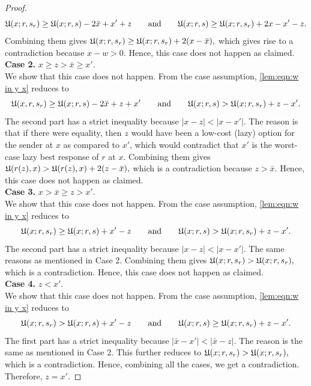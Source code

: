 \begin{proof}
        \begin{equation}
            \mathfrak{U}(x;r,s_r) \geq \mathfrak{U}(x;r,s) - 2\bar{x} + x' + z \quad \hbox{\quad and\quad} \quad \mathfrak{U}(x;r,s) \geq \mathfrak{U}(x;r,s_r) + 2x - x' - z.
        \end{equation}
        Combining them gives
        $
        \mathfrak{U}(x;r,s_r) \geq \mathfrak{U}(x;r,s_r) + 2(x-\bar{x}),
        $
        which gives rise to a contradiction because $x - w > 0$. Hence, this case does not happen as claimed.\\
\textbf{Case 2. }{$x \geq z > \bar{x} \geq x'$.} \\
        We show that this case does not happen. From the case assumption, \eqref{lem:eqn:w in y x} reduces to
        \begin{equation}
            \mathfrak{U}(x,r,s_r) \geq \mathfrak{U}(x;r,s) - 2\bar{x} + z + x' \quad \hbox{\quad and\quad} \quad \mathfrak{U}(x;r,s) > \mathfrak{U}(x;r,s_r) + z - x'.
        \end{equation}
        The second part has a strict inequality because $|x-z| < |x-x'|$. The reason is that if there were equality, then $z$ would have been a low-cost (lazy) option for the sender at $x$ as compared to $x'$, which would contradict that $x'$ is the worst-case lazy best response of $r$ at $x$.
        Combining them gives
        $
        \mathfrak{U}(r(z),x) > \mathfrak{U}(r(z),x) + 2(z-\bar{x}),
        $
        which is a contradiction because $z > \bar{x}$. Hence, this case does not happen as claimed.\\
\textbf{Case 3. }{$x > \bar{x} \geq z > x'$.} \\
        We show that this case does not happen. From the case assumption, \eqref{lem:eqn:w in y x} reduces to
        \begin{equation}
            \mathfrak{U}(x;r,s_r) \geq \mathfrak{U}(x;r,s) + x' - z \quad \hbox{\quad and\quad} \quad \mathfrak{U}(x;r,s) > \mathfrak{U}(x;r,s_r) + z - x'.
        \end{equation}
        The second part has a strict inequality because $|x-z| < |x-x'|$. The same reasons as mentioned in Case 2. Combining them gives
        $
        \mathfrak{U}(x;r,s_r) > \mathfrak{U}(x;r,s_r),
        $
        which is a contradiction. Hence, this case does not happen as claimed.\\
\textbf{Case 4. }{$z < x'$.} \\
        We show that this case does not happen. From the case assumption, \eqref{lem:eqn:w in y x} reduces to
        \begin{equation}
            \mathfrak{U}(x;r,s_r) > \mathfrak{U}(x;r,s) + x' - z \quad \hbox{\quad and\quad} \quad \mathfrak{U}(x;r,s) \geq \mathfrak{U}(x;r,s_r) + z - x'.
        \end{equation}
        The first part has a strict inequality because $|\bar{x}-x'| < |\bar{x}-z|$. The reason is the same as mentioned in Case 2. This further reduces to
        $
        \mathfrak{U}(x;r,s_r) > \mathfrak{U}(x;r,s_r),
        $
        which is a contradiction.
Hence, combining all the cases, we get a contradiction. Therefore, $z = x'$.
\end{proof}

